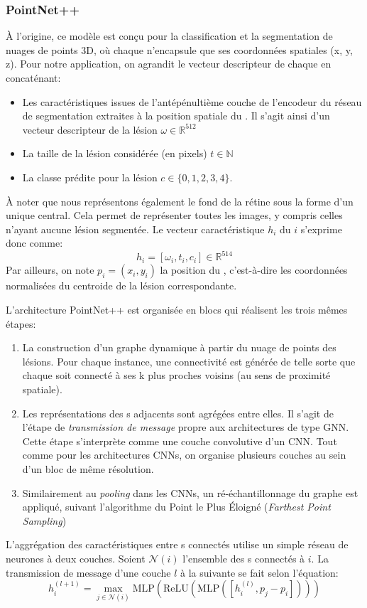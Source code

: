 \subsubsection{PointNet++}
À l'origine, ce modèle est conçu pour la classification et la segmentation de nuages de points 3D, où chaque \noeud{} n'encapsule que ses coordonnées spatiales (x, y, z). Pour notre application, on agrandit le vecteur descripteur de chaque \noeud{} en concaténant:
\begin{itemize}
	\item Les caractéristiques issues de l'antépénultième couche de l'encodeur du réseau de segmentation extraites à la position spatiale du \noeud{}. Il s'agit ainsi d'un vecteur descripteur de la lésion $\omega \in \mathbb{R}^{512}$
	\item La taille de la lésion considérée (en pixels) $t \in \mathbb{N}$
	\item La classe prédite pour la lésion $c \in \{0, 1, 2, 3, 4\}$. 
\end{itemize}
À noter que nous représentons également le fond de la rétine sous la forme d'un unique \noeud{} central. Cela permet de représenter toutes les images, y compris celles n'ayant aucune lésion segmentée.
Le vecteur caractéristique $h_i$ du \noeud{} $i$ s'exprime donc comme:
\begin{equation}
	h_i = [\omega_i, t_i, c_i] \in \mathbb{R}^{514}
\end{equation}
Par ailleurs, on note $p_i = (x_i, y_i)$ la position du \noeud{}, c'est-à-dire les coordonnées normalisées du centroide de la lésion correspondante.

L'architecture PointNet++ est organisée en blocs qui réalisent les trois mêmes étapes:
\begin{enumerate}
	\item La construction d'un graphe dynamique à partir du nuage de points des lésions. Pour chaque instance, une connectivité est générée de telle sorte que chaque \noeud{} soit connecté à ses k plus proches voisins (au sens de proximité spatiale).
	\item Les représentations des \noeud s adjacents sont agrégées entre elles. Il s'agit de l'étape de \textit{transmission de message} propre aux architectures de type \ac{GNN}. Cette étape s'interprète comme une couche convolutive d'un CNN. Tout comme pour les architectures CNNs, on organise plusieurs couches au sein d'un bloc de même résolution. 
	\item Similairement au \textit{pooling} dans les CNNs, un ré-échantillonnage du graphe est appliqué, suivant l'algorithme du Point le Plus Éloigné (\textit{Farthest Point Sampling})
\end{enumerate}
L'aggrégation des caractéristiques entre \noeud s connectés utilise un simple réseau de neurones à deux couches. Soient $\mathcal{N}(i)$ l'ensemble des \noeud s connectés à $i$. La transmission de message d'une couche $l$ à la suivante se fait selon l'équation:
\begin{equation}
	h_i^{(l+1)} = \max_{j \in \mathcal{N}(i)} \text{MLP}(\text{ReLU}(\text{MLP}([h_i^{(l)}, p_j-p_i])))
\end{equation}

